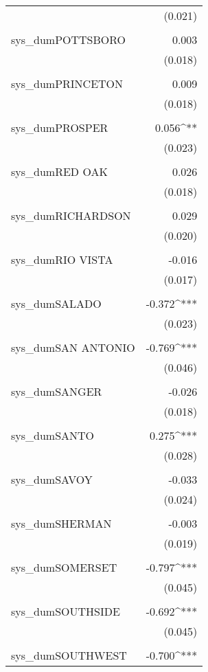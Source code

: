 \begin{table}[!htbp]
\begin{tabular}{@{\extracolsep{5pt}}lD{.}{.}{-3} }
  & (0.021) \\ 
  & \\ 
 sys\_dumPOTTSBORO & 0.003 \\ 
  & (0.018) \\ 
  & \\ 
 sys\_dumPRINCETON & 0.009 \\ 
  & (0.018) \\ 
  & \\ 
 sys\_dumPROSPER & 0.056^{**} \\ 
  & (0.023) \\ 
  & \\ 
 sys\_dumRED OAK & 0.026 \\ 
  & (0.018) \\ 
  & \\ 
 sys\_dumRICHARDSON & 0.029 \\ 
  & (0.020) \\ 
  & \\ 
 sys\_dumRIO VISTA & -0.016 \\ 
  & (0.017) \\ 
  & \\ 
 sys\_dumSALADO & -0.372^{***} \\ 
  & (0.023) \\ 
  & \\ 
 sys\_dumSAN ANTONIO & -0.769^{***} \\ 
  & (0.046) \\ 
  & \\ 
 sys\_dumSANGER & -0.026 \\ 
  & (0.018) \\ 
  & \\ 
 sys\_dumSANTO & 0.275^{***} \\ 
  & (0.028) \\ 
  & \\ 
 sys\_dumSAVOY & -0.033 \\ 
  & (0.024) \\ 
  & \\ 
 sys\_dumSHERMAN & -0.003 \\ 
  & (0.019) \\ 
  & \\ 
 sys\_dumSOMERSET & -0.797^{***} \\ 
  & (0.045) \\ 
  & \\ 
 sys\_dumSOUTHSIDE & -0.692^{***} \\ 
  & (0.045) \\ 
  & \\ 
 sys\_dumSOUTHWEST & -0.700^{***} \\ 

\end{tabular}
\end{table}
